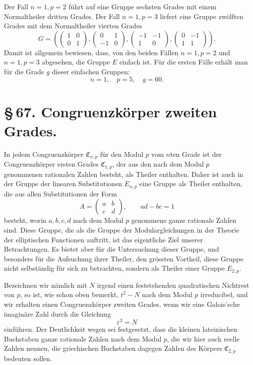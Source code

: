 \documentclass[11pt]{article}
\providecommand{\mat}[4]{\begin{pmatrix}#1&#2\\#3&#4\end{pmatrix}}
\providecommand{\mat}[4]{\begin{pmatrix}#1&#2\\#3&#4\end{pmatrix}}
\providecommand{\Cfield}{\mathfrak C}
\providecommand{\mat}[1]{\begin{pmatrix}#1\end{pmatrix}}
\begin{document}
Der Fall $n=1,p=2$ führt auf eine Gruppe sechsten Grades mit einem Normaltheiler dritten Grades. Der Fall $n=1,p=3$ liefert eine Gruppe zwölften Grades mit dem Normaltheiler vierten Grades
\[
 G=\left(
 \begin{pmatrix}1&0\\0&1\end{pmatrix},
 \begin{pmatrix}0&1\\-1&0\end{pmatrix},
 \begin{pmatrix}-1&-1\\1&0\end{pmatrix},
 \begin{pmatrix}0&-1\\1&1\end{pmatrix}
 \right).
\]
Damit ist allgemein bewiesen, dass, von den beiden Fällen $n=1,p=2$ und $n=1,p=3$ abgesehen, die Gruppe $E$ einfach ist. Für die ersten Fälle erhält man für die Grade $g$ dieser einfachen Gruppen:
\[
 n=1,\quad p=5,\quad g=60.
\]




\section*{\S\,67. Congruenzkörper zweiten Grades.}

In jedem Congruenzkörper $\Cfield_{n,p}$ für den Modul $p$ vom $n$ten Grade ist der Congruenzkörper ersten Grades $\Cfield_{1,p}$, der aus den nach dem Modul $p$ genommenen rationalen Zahlen besteht, als Theiler enthalten. Daher ist auch in der Gruppe der linearen Substitutionen $E_{n,p}$ eine Gruppe als Theiler enthalten, die aus allen Substitutionen der Form
\begin{equation}
 A=\mat{a}{b}{c}{d},\qquad ad-bc=1
 \tag{1}
\end{equation}
besteht, worin $a,b,c,d$ nach dem Modul $p$ genommene ganze rationale Zahlen sind. Diese Gruppe, die als die Gruppe der Modulargleichungen in der Theorie der elliptischen Functionen auftritt, ist das eigentliche Ziel unserer Betrachtungen. Es bietet aber für die Untersuchung dieser Gruppe, und besonders für die Aufsuchung ihrer Theiler, den grössten Vortheil, diese Gruppe nicht selbständig für sich zu betrachten, sondern als Theiler einer Gruppe $E_{2,p}$.

Bezeichnen wir nämlich mit $N$ irgend einen feststehenden quadratischen Nichtrest von $p$, so ist, wie schon oben bemerkt, $t^2-N$ nach dem Modul $p$ irreducibel, und wir erhalten einen Congruenzkörper zweiten Grades, wenn wir eine Galois'sche imaginäre Zahl durch die Gleichung
\begin{equation}
 \varepsilon^2=N
 \tag{2}
\end{equation}
einführen. Der Deutlichkeit wegen sei festgesetzt, dass die kleinen lateinischen Buchstaben ganze rationale Zahlen nach dem Modul $p$, die wir hier auch reelle Zahlen nennen, die griechischen Buchstaben dagegen Zahlen des Körpers $\Cfield_{2,p}$ bedeuten sollen.
\end{document}
